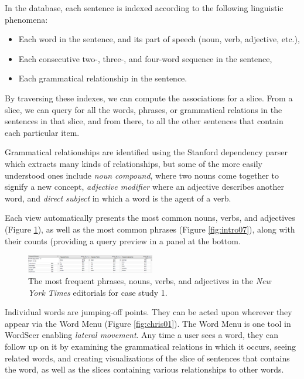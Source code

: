 \documentclass{sig-alternate}
\begin{document}
 In the database, each sentence is indexed according to the following linguistic phenomena:
\begin{itemize}
  \item Each word in the sentence, and its part of speech (noun, verb, adjective, etc.),
  \item Each consecutive two-, three-, and four-word sequence in the sentence,
  \item Each grammatical relationship in the sentence. 
  \end{itemize}  
 By traversing these indexes, we can compute the associations for a slice. From a slice, we can query for all the words, phrases, or grammatical relations in the sentences in that slice, and from there, to all the other sentences that contain each particular item.  

 Grammatical relationships are identified using the Stanford dependency parser\cite{klein_accurate_2003} which extracts many kinds of relationships, but some of the more easily understood ones include \emph{noun compound}, where two nouns come together to signify a new concept, \emph{adjective modifier} where an adjective describes another word, and \emph{direct subject} in which a word is the agent of a verb. 

Each view automatically presents the most common nouns, verbs, and adjectives (Figure \ref{fig:intro06}), as well as the most common phrases (Figure \ref{fig:intro07}), along with their counts (providing a query preview \cite{donn_query_1996} in a panel at the bottom.    
\begin{figure}[ht!]
\begin{center}
	\includegraphics[width=0.5\textwidth]{fig/intro/06.png}
\end{center}
    \caption{%
       The most frequent phrases, nouns, verbs, and adjectives in the \emph{New York Times} editorials for case study 1.  \label{fig:intro06}
     }%
\end{figure}

Individual words are jumping-off points. They can be acted upon wherever they appear via the Word Menu (Figure \ref{fig:chris01}). The Word Menu is one tool in  WordSeer enabling \emph{lateral movement}.  Any time a user sees a word, they can follow up on it by examining the grammatical relations in which it occurs, seeing related words,  and creating visualizations of the slice of sentences that contains the word, as well as the slices containing various relationships to other words.
\end{document}
